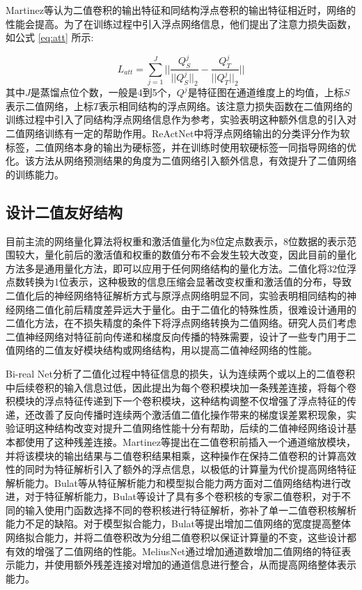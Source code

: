 Martinez等\cite{realtobin}认为二值卷积的输出特征和同结构浮点卷积的输出特征相近时，网络的性能会提高。为了在训练过程中引入浮点网络信息，他们提出了注意力损失函数，如公式 \eqref{eq:att} 所示:

\begin{equation}
  \label{eq:att}
  L_{att} = \sum_{j = 1}^{J} ||\frac{Q_S^j}{||Q_S^j||_2} - \frac{Q_T^j}{||Q_T^j||_2}||
\end{equation}
其中$J$是蒸馏点位个数，一般是4到5个，$Q^j$是特征图在通道维度上的均值，上标$S$表示二值网络，上标$T$表示相同结构的浮点网络。该注意力损失函数在二值网络的训练过程中引入了同结构浮点网络信息作为参考，实验表明这种额外信息的引入对二值网络训练有一定的帮助作用。ReActNet\cite{reactnet}中将浮点网络输出的分类评分作为软标签，二值网络本身的输出为硬标签，并在训练时使用软硬标签一同指导网络的优化。该方法从网络预测结果的角度为二值网络引入额外信息，有效提升了二值网络的训练能力。

\subsection{设计二值友好结构}

目前主流的网络量化算法将权重和激活值量化为8位定点数表示，8位数据的表示范围较大，量化前后的激活值和权重的数值分布不会发生较大改变，因此目前的量化方法多是通用量化方法，即可以应用于任何网络结构的量化方法。二值化将32位浮点数转换为1位表示，这种极致的信息压缩会显著改变权重和激活值的分布，导致二值化后的神经网络特征解析方式与原浮点网络明显不同，实验表明相同结构的神经网络二值化前后精度差异远大于量化。由于二值化的特殊性质，很难设计通用的二值化方法，在不损失精度的条件下将浮点网络转换为二值网络。研究人员们考虑二值神经网络对特征前向传递和梯度反向传播的特殊需要，设计了一些专门用于二值网络的二值友好模块结构或网络结构，用以提高二值神经网络的性能。

Bi-real Net\cite{birealnet}分析了二值化过程中特征信息的损失，认为连续两个或以上的二值卷积中后续卷积的输入信息过低，因此提出为每个卷积模块加一条残差连接，将每个卷积模块的浮点特征传递到下一个卷积模块，这种结构调整不仅增强了浮点特征的传递，还改善了反向传播时连续两个激活值二值化操作带来的梯度误差累积现象，实验证明这种结构改变对提升二值网络性能十分有帮助，后续的二值神经网络设计基本都使用了这种残差连接。Martinez等\cite{realtobin}提出在二值卷积前插入一个通道缩放模块，并将该模块的输出结果与二值卷积结果相乘，这种操作在保持二值卷积的计算高效性的同时为特征解析引入了额外的浮点信息，以极低的计算量为代价提高网络特征解析能力。Bulat等\cite{expert}从特征解析能力和模型拟合能力两方面对二值网络结构进行改进，对于特征解析能力，Bulat等设计了具有多个卷积核的专家二值卷积，对于不同的输入使用门函数选择不同的卷积核进行特征解析，弥补了单一二值卷积核解析能力不足的缺陷。对于模型拟合能力，Bulat等提出增加二值网络的宽度提高整体网络拟合能力，并将二值卷积改为分组二值卷积以保证计算量的不变，这些设计都有效的增强了二值网络的性能。MeliusNet\cite{meliusnet}通过增加通道数增加二值网络的特征表示能力，并使用额外残差连接对增加的通道信息进行整合，从而提高网络整体表示能力。

